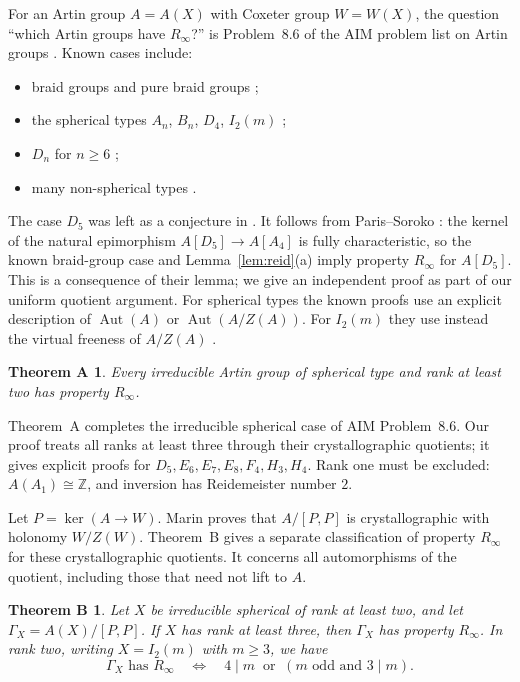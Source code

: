 \documentclass[11pt]{article}
\newtheorem*{mainthm}{Theorem A}
\newtheorem*{quotientthm}{Theorem B}
\theoremstyle{definition}
\newcommand{\Z}{\mathbb{Z}}
\newcommand{\Aut}{\operatorname{Aut}}
\newcommand{\Rinf}{R_\infty}
\begin{document}
For an Artin group $A=A(X)$ with Coxeter group $W=W(X)$, the question ``which Artin groups have $\Rinf$?''
is Problem~8.6 of the AIM problem list on Artin groups \cite{AIMPL}. Known cases include:
\begin{itemize}
\item braid groups \cite{FG10} and pure braid groups \cite{DGO21};
\item the spherical types $A_n$, $B_n$, $D_4$, $I_2(m)$ \cite{CS22};
\item $D_n$ for $n\ge6$ \cite[Thm.~1]{SV24};
\item many non-spherical types \cite{Juh11,SV24,Sor26}.
\end{itemize}
The case $D_5$ was left as a conjecture in \cite[\S1]{SV24}.
It follows from Paris--Soroko \cite[Lemma~4]{PS26}: the kernel of the natural epimorphism
$A[D_5]\to A[A_4]$ is fully characteristic, so the known braid-group case \cite{FG10}
and Lemma~\ref{lem:reid}(a) imply property $\Rinf$ for $A[D_5]$.
This is a consequence of their lemma; we give an independent proof as part of our uniform quotient argument.
For spherical types the known proofs use an explicit description of $\Aut(A)$ or $\Aut(A/Z(A))$. For $I_2(m)$
they use instead the virtual freeness of $A/Z(A)$ \cite{CS22}.

\begin{mainthm}
Every irreducible Artin group of spherical type and rank at least two has property $\Rinf$.
\end{mainthm}

Theorem~A completes the irreducible spherical case of AIM Problem~8.6.
Our proof treats all ranks at least three through their crystallographic quotients; it gives explicit
proofs for $D_5,E_6,E_7,E_8,F_4,H_3,H_4$.
Rank one must be excluded: $A(A_1)\cong\Z$, and inversion has Reidemeister number $2$.

Let $P=\ker(A\to W)$. Marin \cite[Thm.~2.1]{Mar15} proves that $A/[P,P]$ is crystallographic with holonomy
$W/Z(W)$. Theorem~B gives a separate classification of property $\Rinf$ for these crystallographic quotients.
It concerns all automorphisms of the quotient, including those that need not lift to $A$.

\begin{quotientthm}
Let $X$ be irreducible spherical of rank at least two, and let $\Gamma_X=A(X)/[P,P]$.
If $X$ has rank at least three, then $\Gamma_X$ has property $\Rinf$.
In rank two, writing $X=I_2(m)$ with $m\ge3$, we have
\[
 \Gamma_X\text{ has }\Rinf
 \quad\Longleftrightarrow\quad
 4\mid m\ \text{ or }\ (m\text{ odd and }3\mid m).
\]
\end{quotientthm}
\end{document}
